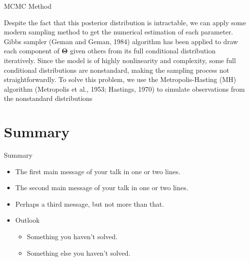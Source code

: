 \documentclass{beamer}
\begin{document}
\begin{frame}{MCMC Method}
\begin{block}{}
Despite the fact that this posterior distribution is intractable, we can apply some modern sampling method to get the numerical estimation of each parameter. Gibbs sampler (Geman and Geman, 1984) algorithm has been applied to draw each component of $\bm{\Theta}$ given others from its full conditional distribution iteratively. Since the model is of highly nonlinearity and complexity, some full conditional distributions are nonstandard, making the sampling process not straightforwardly. To solve this problem, we use the Metropolis-Hasting (MH) algorithm (Metropolis et al., 1953; Hastings, 1970) to simulate observations from the nonstandard distributions
\end{block}
\end{frame}



\section*{Summary}

\begin{frame}{Summary}
  \begin{itemize}
  \item
    The \alert{first main message} of your talk in one or two lines.
  \item
    The \alert{second main message} of your talk in one or two lines.
  \item
    Perhaps a \alert{third message}, but not more than that.
  \end{itemize}
  
  \begin{itemize}
  \item
    Outlook
    \begin{itemize}
    \item
      Something you haven't solved.
    \item
      Something else you haven't solved.
    \end{itemize}
  \end{itemize}
\end{frame}
\end{document}
